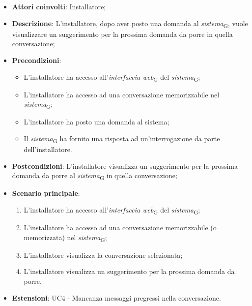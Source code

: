 \begin{itemize}
    \item \textbf{Attori coinvolti}: Installatore;
    \item \textbf{Descrizione}: L'installatore, dopo aver posto una domanda al \textit{sistema}\textsubscript{G}, vuole visualizzare un suggerimento per la prossima domanda da porre in quella conversazione;
    \item \textbf{Precondizioni}: 
    \begin{itemize}
        \item L’installatore ha accesso all’\textit{interfaccia web}\textsubscript{G} del \textit{sistema}\textsubscript{G};
        \item L’installatore ha accesso ad una conversazione memorizzabile nel \textit{sistema}\textsubscript{G};
        \item L'installatore ha posto una domanda al sistema;
        \item Il \textit{sistema}\textsubscript{G} ha fornito una risposta ad un’interrogazione da parte dell’installatore.
    \end{itemize}
    \item \textbf{Postcondizioni}: L'installatore visualizza un suggerimento per la prossima domanda da porre al \textit{sistema}\textsubscript{G} in quella conversazione;
    \item \textbf{Scenario principale}:
    \begin{enumerate}
        \item L’installatore ha accesso all’\textit{interfaccia web}\textsubscript{G} del \textit{sistema}\textsubscript{G};
        \item L’installatore ha accesso ad una conversazione memorizzabile (o memorizzata) nel \textit{sistema}\textsubscript{G};
        \item L'installatore visualizza la conversazione selezionata;
        \item L'installatore visualizza un suggerimento per la prossima domanda da porre.
    \end{enumerate}
    \item \textbf{Estensioni}: UC4 - Mancanza messaggi pregressi nella conversazione.
\end{itemize}

